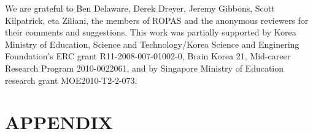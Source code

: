 \documentclass[acmlarge, anonymous, review, authorname]{acmart}
\begin{document}








%






\begin{acks}
We are grateful to Ben Delaware, Derek Dreyer, Jeremy Gibbons, Scott
Kilpatrick, eta Ziliani, the members of ROPAS and the
anonymous reviewers for their comments and suggestions.  This work was
partially supported by Korea Ministry of Education, Science and
Technology/Korea Science and Enginering Foundation's ERC grant
R11-2008-007-01002-0, Brain Korea 21, Mid-career Research Program 2010-0022061, and
by Singapore Ministry of Education research grant MOE2010-T2-2-073.
\end{acks}

\newpage


\newpage
\appendix
\section*{APPENDIX}
\setcounter{section}{1}





\end{document}
